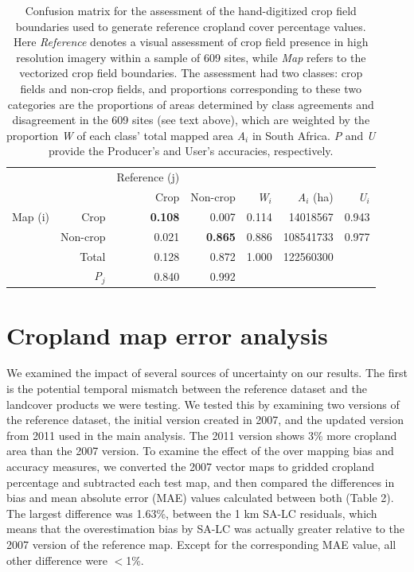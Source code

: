 \documentclass[11pt, titlepage]{article}
\begin{document}
\begin{table}[!ht]
\centering
\caption{Confusion matrix for the assessment of the hand-digitized crop field boundaries used to generate reference cropland cover percentage values. Here \emph{Reference} denotes a visual assessment of crop field presence in high resolution imagery within a sample of 609 sites, while \emph{Map} refers to the vectorized crop field boundaries. The assessment had two classes: crop fields and non-crop fields, and proportions corresponding to these two categories are the proportions of areas determined by class agreements and disagreement in the 609 sites (see text above), which are weighted by the proportion \emph{W} of each class' total mapped area \emph{A$_i$} in South Africa. \emph{P} and \emph{U} provide the Producer's and User's accuracies, respectively. }
\begin{tabular}{rrrrrrr}
  \hline
  & & Reference (j) & & & & \\\cline{3-7}
  & & Crop & Non-crop & \emph{W}$_i$ & \emph{A}$_i$ (ha) & \emph{U}$_i$ \\ 
  \hline
  Map (i) & Crop & \textbf{0.108} & 0.007 & 0.114 & 14018567 & 0.943 \\ 
  & Non-crop & 0.021 & \textbf{0.865} & 0.886 & 108541733 & 0.977 \\ 
  & Total & 0.128 & 0.872 & 1.000 & 122560300 &  \\ 
  & \emph{P}$_j$ & 0.840 & 0.992 &  &  &  \\ 
   \hline
\end{tabular}
\end{table}

\FloatBarrier
\section{\large Cropland map error analysis}
We examined the impact of several sources of uncertainty on our results.  The first is the potential temporal mismatch between the reference dataset and the landcover products we were testing.  We tested this by examining two versions of the reference dataset, the initial version created in 2007, and the updated version from 2011 used in the main analysis.  The 2011 version shows 3\% more cropland area than the 2007 version. To examine the effect of the over mapping bias and accuracy measures, we converted the 2007 vector maps to gridded cropland percentage and subtracted each test map, and then compared the differences in bias and mean absolute error (MAE) values calculated between both (Table 2). The largest difference was 1.63\%, between the 1 km SA-LC residuals, which means that the overestimation bias by SA-LC was actually greater relative to the 2007 version of the reference map.  Except for the corresponding MAE value, all other difference were $<$1\%. 
\end{document}
